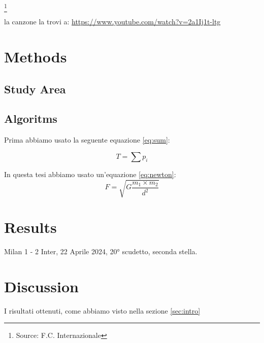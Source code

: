 \documentclass[12pt]{article} %
\begin{document}
\footnote{Source: F.C. Internazionale} %

la canzone la trovi a:
\url{https://www.youtube.com/watch?v=2a1Ij1t-ltg} %

\section{Methods} %

\subsection{Study Area} %
\subsection{Algoritms}


Prima abbiamo usato la seguente equazione \ref{eq:sum}: %

\begin{equation} %
    T = \sum p_i %
\label{eq:sum} %
\end{equation} %

In questa tesi abbiamo usato un'equazione \ref{eq:newton}:
\begin{equation}
    F = \sqrt{G \frac{m_1\times m_2}{d^2}} %
\label{eq:newton}
\end{equation}

\section{Results}
Milan 1 - 2 Inter, 22 Aprile 2024, 20° scudetto, seconda stella.

\section{Discussion}
I risultati ottenuti, come abbiamo visto nella sezione \ref{sec:intro} %
\end{document}
